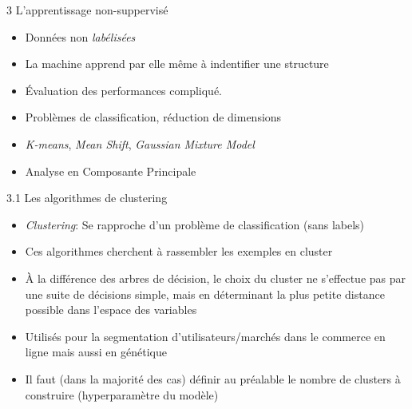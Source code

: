 \begin{frame}{3 L'apprentissage non-suppervisé}
  \begin{itemize}
  \item Données non \textit{labélisées}
  \item La machine apprend par elle même à indentifier une structure
  \item Évaluation des performances compliqué.
  \item Problèmes de classification, réduction de dimensions
  \item \textit{K-means}, \textit{Mean Shift}, \textit{Gaussian Mixture Model}
  \item Analyse en Composante Principale
  \end{itemize}  
\end{frame}

\begin{frame}{3.1 Les algorithmes de clustering}
  \begin{itemize}
  \item \textit{Clustering}: Se rapproche d'un problème de classification (sans labels)
  \item Ces algorithmes cherchent à rassembler les exemples en cluster
  \item À la différence des arbres de décision, le choix du cluster ne s'effectue pas par une suite de décisions simple, mais en déterminant la plus petite distance possible dans l'espace des variables
  \item Utilisés pour la segmentation d'utilisateurs/marchés dans le commerce en ligne mais aussi en génétique
  \item Il faut (dans la majorité des cas) définir au préalable le nombre de clusters à construire (hyperparamètre du modèle)
  \end{itemize}
\end{frame}

